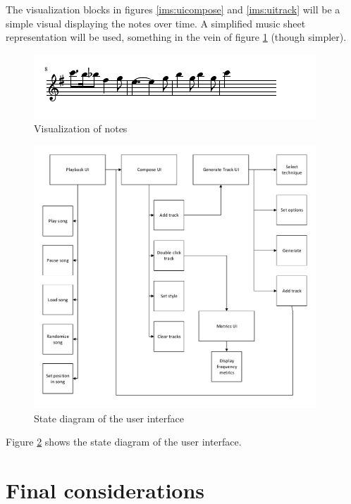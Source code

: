 The visualization blocks in figures \ref{ims:uicompose} and \ref{ims:uitrack} will be a simple visual displaying the notes over time. A simplified music sheet representation will be used, something in the vein of figure \ref{ims:uiharrymusicsheet} (though simpler).

\begin{figure}
\centerline{\includegraphics[width=400px]{../images/ui_visualization.pdf}}
\caption{Visualization of notes}
\label{ims:uiharrymusicsheet}
\end{figure}


\begin{figure}
\centerline{\includegraphics[width=400px]{../images/ui_control_blockdiagram.pdf}}
\caption{State diagram of the user interface}
\label{ims:uiflow}
\end{figure}

Figure \ref{ims:uiflow} shows the state diagram of the user interface.


\chapter{Final considerations}